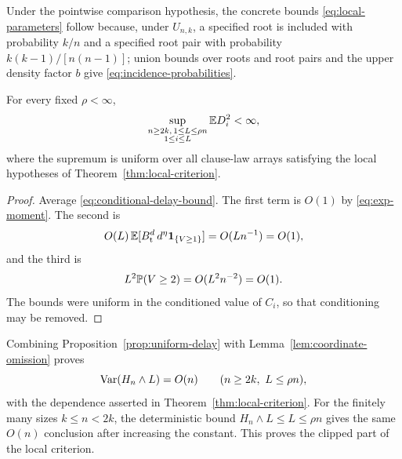 Under the pointwise comparison hypothesis, the concrete bounds
\eqref{eq:local-parameters} follow because, under $U_{n,k}$, a specified
root is included with probability $k/n$ and a specified root pair with
probability $k(k-1)/[n(n-1)]$; union bounds over roots and root pairs and
the upper density factor $b$ give \eqref{eq:incidence-probabilities}.

\begin{proposition}
\label{prop:uniform-delay}
For every fixed $\rho<\infty$,
\[
    \sup_{\substack{n\ge2k,\,1\le L\le\rho n\\1\le i\le L}}
    \mathbb E D_i^2
    <\infty,
\]
where the supremum is uniform over all clause-law arrays satisfying the
local hypotheses of Theorem~\ref{thm:local-criterion}.
\end{proposition}

\begin{proof}
Average \eqref{eq:conditional-delay-bound}.  The first term is $O(1)$ by
\eqref{eq:exp-moment}.  The second is
\[
    O(L)\,
    \mathbb E[B_{\mathrm{t}}^d\,d^\eta\mathbf 1_{\{V\ge1\}}]
    =O(Ln^{-1})=O(1),
\]
and the third is
\[
    L^2\mathbb P(V\ge2)=O(L^2n^{-2})=O(1).
\]
The bounds were uniform in the conditioned value of $C_i$, so that
conditioning may be removed.
\end{proof}

Combining Proposition~\ref{prop:uniform-delay} with
Lemma~\ref{lem:coordinate-omission} proves
\begin{equation}
    \operatorname{Var}(H_n\wedge L)=O(n)
    \qquad(n\ge2k,\ L\le\rho n),
    \label{eq:capped-variance}
\end{equation}
with the dependence asserted in Theorem~\ref{thm:local-criterion}.  For the
finitely many sizes $k\le n<2k$, the deterministic bound
$H_n\wedge L\le L\le\rho n$ gives the same $O(n)$ conclusion after
increasing the constant.  This proves the clipped part of the local
criterion.
